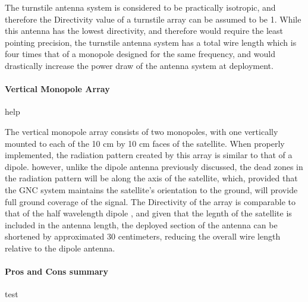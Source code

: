 The turnstile antenna system is considered to be practically isotropic, and therefore the Directivity value of a turnstile array can be assumed to be 1.\cite{Wong} While this antenna has the lowest directivity, and therefore would require the least pointing precision, the turnstile antenna system has a total wire length which is four times that of a monopole designed for the same frequency, and would drastically increase the power draw of the antenna system at deployment.

\paragraph{Vertical Monopole Array}

help

The vertical monopole array consists of two monopoles, with one vertically mounted to each of the 10 cm by 10 cm faces of the satellite. When properly implemented, the radiation pattern created by this array is similar to that of a dipole. however, unlike the dipole antenna previously discussed, the dead zones in the radiation pattern will be along the axis of the satellite, which, provided that the GNC system maintains the satellite's orientation to the ground, will provide full ground coverage of the signal. The Directivity of the array is comparable to that of the half wavelength dipole \cite{Dipole}, and given that the legnth of the satellite is included in the antenna length, the deployed section of the antenna can be shortened by approximated 30 centimeters, reducing the overall wire length relative to the dipole antenna.

\paragraph{Pros and Cons summary}

test

